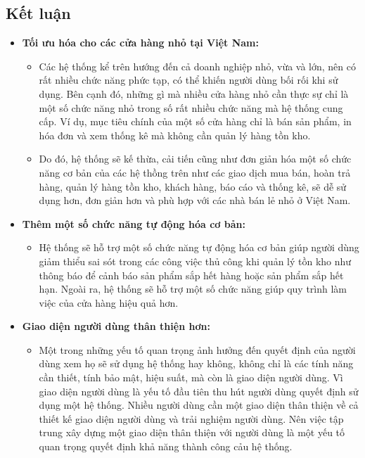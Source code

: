 \subsection{Kết luận}
\begin{itemize}
    \item \textbf{Tối ưu hóa cho các cửa hàng nhỏ tại Việt Nam:}
        \begin{itemize}
            \item Các hệ thống kể trên hướng đến cả doanh nghiệp nhỏ, vừa và lớn, nên có rất nhiều chức năng phức tạp, có thể khiến người dùng bối rối khi sử dụng. Bên cạnh đó, những gì mà nhiều cửa hàng nhỏ cần thực sự chỉ là một số chức năng nhỏ trong số rất nhiều chức năng mà hệ thống cung cấp. Ví dụ, mục tiêu chính của một số cửa hàng chỉ là bán sản phẩm, in hóa đơn và xem thống kê mà không cần quản lý hàng tồn kho. 
            \item Do đó, hệ thống sẽ kế thừa, cải tiến cũng như đơn giản hóa một số chức năng cơ bản của các hệ thồng trên như các giao dịch mua bán, hoàn trả hàng, quản lý hàng tồn kho, khách hàng, báo cáo và thống kê, sẽ dễ sử dụng hơn, đơn giản hơn và phù hợp với các nhà bán lẻ nhỏ ở Việt Nam.
        \end{itemize}
    \item \textbf{Thêm một số chức năng tự động hóa cơ bản:}
        \begin{itemize}
            \item Hệ thống sẽ hỗ trợ một số chức năng tự động hóa cơ bản giúp người dùng giảm thiểu sai sót trong các công việc thủ công khi quản lý tồn kho như thông báo để cảnh báo sản phẩm sắp hết hàng hoặc sản phẩm sắp hết hạn. Ngoài ra, hệ thống sẽ hỗ trợ một số chức năng giúp quy trình làm việc của cửa hàng hiệu quả hơn.
        \end{itemize}
    \item \textbf{Giao diện người dùng thân thiện hơn:}
        \begin{itemize}
            \item Một trong những yếu tố quan trọng ảnh hưởng đến quyết định của người dùng xem họ sẽ sử dụng hệ thống hay không, không chỉ là các tính năng cần thiết, tính bảo mật, hiệu suất, mà còn là giao diện người dùng. Vì giao diện người dùng là yếu tố đầu tiên thu hút người dùng quyết định sử dụng một hệ thống. Nhiều người dùng cần một giao diện thân thiện về cả thiết kế giao diện người dùng và trải nghiệm người dùng. Nên việc tập trung xây dựng một giao diện thân thiện với người dùng là một yếu tố quan trọng quyết định khả năng thành công cảu hệ thống.
        \end{itemize}
\end{itemize}